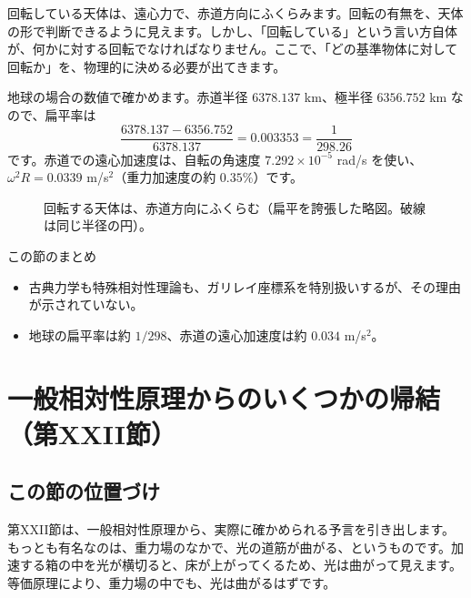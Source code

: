 \documentclass[a4paper,11pt,openany]{ltjsbook}
\begin{document}
回転している天体は、遠心力で、赤道方向にふくらみます。回転の有無を、天体の形で判断できるように見えます。しかし、「回転している」という言い方自体が、何かに対する回転でなければなりません。ここで、「どの基準物体に対して回転か」を、物理的に決める必要が出てきます。

地球の場合の数値で確かめます。赤道半径 $6378.137$ km、極半径 $6356.752$ km なので、扁平率は
\[
\frac{6378.137-6356.752}{6378.137}=0.003353=\frac1{298.26}
\]
です。赤道での遠心加速度は、自転の角速度 $7.292\times10^{-5}$ rad/s を使い、$\omega^2R=0.0339$ m/s$^2$（重力加速度の約 $0.35\%$）です。

\begin{figure}[htbp]
\centering
{}
\caption{回転する天体は、赤道方向にふくらむ（扁平を誇張した略図。破線は同じ半径の円）。}
\end{figure}

\begin{pointbox}{この節のまとめ}
\begin{itemize}[leftmargin=*]
\item 古典力学も特殊相対性理論も、ガリレイ座標系を特別扱いするが、その理由が示されていない。
\item 地球の扁平率は約 $1/298$、赤道の遠心加速度は約 $0.034$ m/s$^2$。
\end{itemize}
\end{pointbox}

\chapter{一般相対性原理からのいくつかの帰結（第XXII節）}

\section{この節の位置づけ}

第XXII節は、一般相対性原理から、実際に確かめられる予言を引き出します。もっとも有名なのは、重力場のなかで、光の道筋が曲がる、というものです。加速する箱の中を光が横切ると、床が上がってくるため、光は曲がって見えます。等価原理により、重力場の中でも、光は曲がるはずです。
\end{document}

